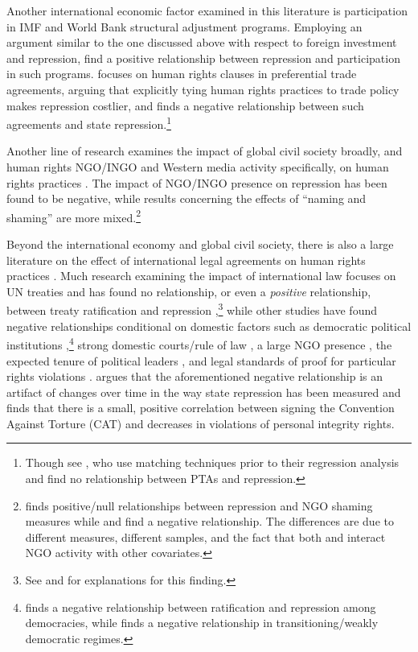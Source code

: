 \documentclass[11pt]{article}
\begin{document}
Another international economic factor examined in this literature is participation in IMF and World Bank structural adjustment programs. Employing an argument similar to the one discussed above with respect to foreign investment and repression, \citet{AbouharbCingranelli2006, AbouharbCingranelli2007} find a positive relationship between repression and participation in such programs. \citet{HafnerBurton2005io} focuses on human rights clauses in preferential trade agreements, arguing that explicitly tying human rights practices to trade policy makes repression costlier, and finds a negative relationship between such agreements and state repression.\footnote{Though see \citet{SpilkerBohmelt2012}, who use matching techniques prior to their regression analysis and find no relationship between PTAs and repression.} 

Another line of research examines the impact of global civil society broadly, and human rights NGO/INGO and Western media activity specifically, on human rights practices \citep{HafnerBurtonTsutsui2005,Franklin2008,HafnerBurton2008,MurdieDavis2012}. The impact of NGO/INGO presence on repression has been found to be negative, while results concerning the effects of ``naming and shaming'' are more mixed.\footnote{\citet{HafnerBurton2008} finds positive/null relationships between repression and NGO shaming measures while \citet{Franklin2008} and \citet{MurdieDavis2012} find a negative relationship. The differences are due to different measures, different samples, and the fact that both \citet{Franklin2008} and \citet{MurdieDavis2012} interact NGO activity with other covariates.} 

Beyond the international economy and global civil society, there is also a large literature on the effect of international legal agreements on human rights practices \citep{Keith1999,Hathaway2002,Neumayer2005,Simmons2009,PowellStaton2009,Hill2010,ConradRitter2013,Lupu2013,Fariss2013}. Much research examining the impact of international law focuses on UN treaties and has found no relationship, or even a {\em positive} relationship, between treaty ratification and repression \citep{Keith1999,Hathaway2002,Hill2010},\footnote{See \citet{Vreeland2008} and \citet{HollyerRosendorff2011} for explanations for this finding.} while other studies have found negative relationships conditional on domestic factors such as democratic political institutions \citep{Neumayer2005,Simmons2009},\footnote{\citet{Neumayer2005} finds a negative relationship between ratification and repression among democracies, while \citet{Simmons2009} finds a negative relationship in transitioning/weakly democratic regimes.} strong domestic courts/rule of law \citep{Simmons2009}, a large NGO presence \citep{Neumayer2005}, the expected tenure of political leaders \citep{ConradRitter2013}, and legal standards of proof for particular rights violations \citep{Lupu2013}. \citet{Fariss2013} argues that the aforementioned negative relationship is an artifact of changes over time in the way state repression has been measured and finds that there is a small, positive correlation between signing the Convention Against Torture (CAT) and decreases in violations of personal integrity rights.
\end{document}
